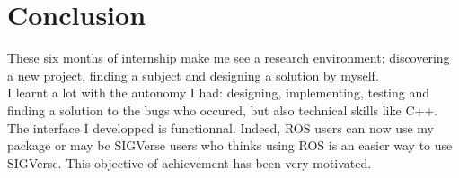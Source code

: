 \chapter{Conclusion}
\setlength{\parskip}{2.5ex plus .4ex minus .4ex}
These six months of internship make me see a research environment: discovering a new project, finding a subject and designing a solution by myself.\\
I learnt a lot with the autonomy I had: designing, implementing, testing and finding a solution to the bugs who occured, but also technical skills like C++.\\

The interface I developped is functionnal. Indeed, ROS users can now use my package or may be SIGVerse users who thinks using ROS is an easier way to use SIGVerse. This objective of achievement has been very motivated.\\



%

